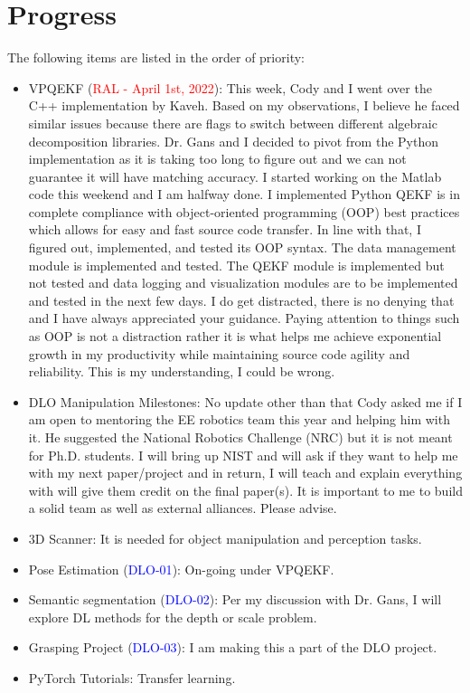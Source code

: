 \documentclass[11pt]{article}
\begin{document}
\section{Progress}
The following items are listed in the order of priority:
\begin{itemize}
    \item VPQEKF (\textcolor{red}{RAL - April 1st, 2022}): This week, Cody and
    I went over the C++ implementation by Kaveh. Based on my observations, I
    believe he faced similar issues because there are flags to switch between
    different algebraic decomposition libraries. Dr. Gans and I decided to pivot
    from the Python implementation as it is taking too long to figure out and
    we can not guarantee it will have matching accuracy. I started working on
    the Matlab code this weekend and I am halfway done. I implemented Python
    QEKF is in complete compliance with object-oriented programming (OOP) best
    practices
    which allows for easy and fast source code transfer. In line with that, I
    figured out, implemented, and tested its OOP syntax. The data management
    module is implemented and tested. The QEKF module is implemented but not
    tested and data logging and visualization modules are to be implemented and
    tested in the next few days. I do get distracted, there is no denying that
    and I have always appreciated your guidance. Paying attention to things such
    as OOP is not a distraction rather it is what helps me achieve
    exponential growth in my productivity while maintaining source code
    agility and reliability. This is my understanding, I could be wrong.

    \item DLO Manipulation Milestones: No update other than that Cody asked me
    if I am open to mentoring the EE robotics team this year and helping him with it.
    He suggested the National Robotics Challenge (NRC) but it is not meant for
    Ph.D. students. I will bring up NIST and will ask if they want to help me
    with my next paper/project and in return, I will teach and explain everything
    with will give them credit on the final paper(s). It is important to me to
    build a solid team as well as external alliances. Please advise.


    \item 3D Scanner: It is needed for object manipulation and perception tasks.
    \item Pose Estimation (\textcolor{blue}{DLO-01}): On-going under VPQEKF.
    \item Semantic segmentation (\textcolor{blue}{DLO-02}): Per my discussion with Dr. Gans, I
    will explore DL methods for the depth or scale problem.
    \item Grasping Project (\textcolor{blue}{DLO-03}): I am making this a part of the DLO project.
    \item PyTorch Tutorials: Transfer learning.

  \end{itemize}
\end{document}
